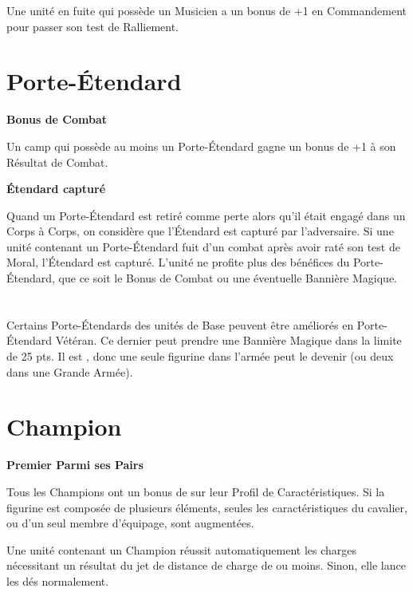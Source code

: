 Une unité en fuite qui possède un Musicien a un bonus de +1 en Commandement pour passer son test de Ralliement.

\newpage
\section{Porte-Étendard}

\noindent\textbf{Bonus de Combat}

Un camp qui possède au moins un Porte-Étendard gagne un bonus de +1 à son Résultat de Combat.

\noindent\textbf{Étendard capturé}

Quand un Porte-Étendard est retiré comme perte alors qu'il était engagé dans un Corps à Corps, on considère que l'Étendard est capturé par l'adversaire. Si une unité contenant un Porte-Étendard fuit d'un combat après avoir raté son test de Moral, l'Étendard est capturé.  L'unité ne profite plus des bénéfices du Porte-Étendard, que ce soit le Bonus de Combat ou une éventuelle Bannière Magique.

\section[Porte-Étendard Vétéran]{}

Certains Porte-Étendards des unités de Base peuvent être améliorés en Porte-Étendard Vétéran. Ce dernier peut prendre une Bannière Magique dans la limite de 25 pts. Il est \oneofakind{}, donc une seule figurine dans l'armée peut le devenir (ou deux dans une Grande Armée).

\section{Champion}

\noindent\textbf{Premier Parmi ses Pairs}

Tous les Champions ont un bonus de  sur leur Profil de Caractéristiques. Si la figurine est composée de plusieurs éléments, seules les caractéristiques du cavalier, ou d'un seul membre d'équipage, sont augmentées.

\noindent\textbf{}

Une unité contenant un Champion réussit automatiquement les charges nécessitant un résultat du jet de distance de charge de  ou moins. Sinon, elle lance les dés normalement.

